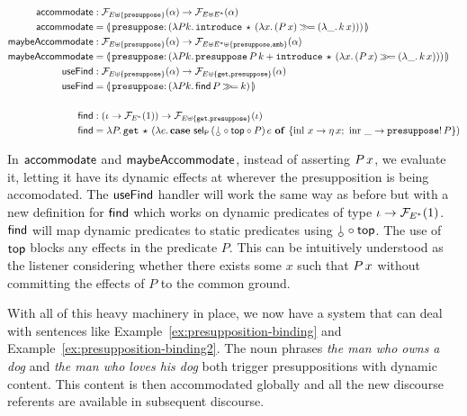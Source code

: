 \begin{align*}
  \accommodate &: \FF_{E \uplus \{\op{presuppose}\}}(\alpha) \to \FF_{E \uplus E^*}(\alpha) \\
  \accommodate &= \banana{\onto{\op{presuppose}}{(\lam{P k}{
    \app{\op{introduce}}{\star}{(\lam{x}{(\ap{P}{x}) \hsbind (\lam{\_}{\ap{k}{x}})})}})}} \\
  \maybeAccommodate &: \FF_{E \uplus \{\op{presuppose}\}}(\alpha) \to
                      \FF_{E \uplus E^* \uplus \{\op{presuppose},\op{amb}\}}(\alpha) \\
  \maybeAccommodate &= \banana{\onto{\op{presuppose}}{(\lam{P k}{
    \app{\op{presuppose}}{P}{k} +
    \app{\op{introduce}}{\star}{(\lam{x}{(\ap{P}{x}) \hsbind (\lam{\_}{\ap{k}{x}})})}})}} \\
  \useFind &: \FF_{E \uplus \{\op{presuppose}\}}(\alpha) \to \FF_{E \uplus \{\op{get}, \op{presuppose}\}}(\alpha) \\
  \useFind &= \banana{\onto{\op{presuppose}}{(\lam{P k}{\ap{\find}{P} \hsbind k})}} \\
  \\
  \find &: (\iota \to \FF_{E^*}(1)) \to \FF_{E \uplus \{\op{get}, \op{presuppose}\}}(\iota) \\
  \find &= \lam{P}{\app{\op{get}}{\star}{(\lam{e}{\case{\app{\selP}{(\cherry \circ \TOP \circ P)}{e}}{x}{\etaE{x}}{\_}{\ap{\op{presuppose}!}{P}}})}}
\end{align*}

In $\textsf{accommodate}$ and $\textsf{maybeAccommodate}$, instead of asserting
$P\,x$, we evaluate it, letting it have its dynamic effects at
wherever the presupposition is being accomodated. The $\textsf{useFind}$ handler
will work the same way as before but with a new definition for $\textsf{find}$
which works on dynamic predicates of type $\iota \to \mathcal{F}_{E^*}(1)$. $\textsf{find}$
will map dynamic predicates to static predicates using
$\cherry \circ \TOP$. The use of $\textsf{top}$ blocks any effects in the predicate
$P$. This can be intuitively understood as the listener considering whether
there exists some $x$ such that $P\,x$ without committing the effects
of $P$ to the common ground.

With all of this heavy machinery in place, we now have a system that can
deal with sentences like Example~\ref{ex:presupposition-binding} and
Example~\ref{ex:presupposition-binding2}. The noun phrases \emph{the man
  who owns a dog} and \emph{the man who loves his dog} both trigger
presuppositions with dynamic content. This content is then accommodated
globally and all the new discourse referents are available in subsequent
discourse.

